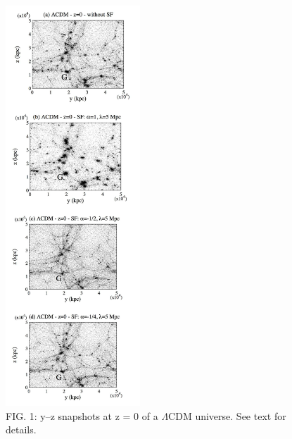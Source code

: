 \documentclass[10pt,twocolumn]{article}
\begin{document}
\begin{figure}[h]
\centering
\raggedright
\includegraphics[width=0.45\textwidth]{imagenarticulo.png}
\caption{FIG. 1: y–z snapshots at z = 0 of a $\Lambda$CDM universe. See text for details.}
\label{fig}
\end{figure}
\\
\end{document}
